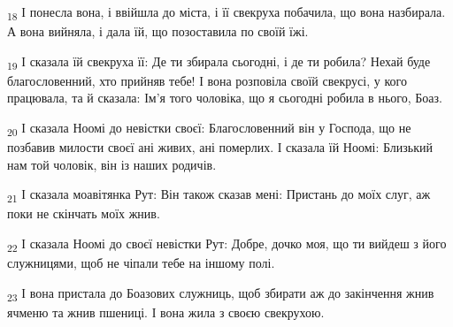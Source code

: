 \begin{tcolorbox}
\textsubscript{18} І понесла вона, і ввійшла до міста, і її свекруха побачила, що вона назбирала. А вона вийняла, і дала їй, що позоставила по своїй їжі.
\end{tcolorbox}
\begin{tcolorbox}
\textsubscript{19} І сказала їй свекруха її: Де ти збирала сьогодні, і де ти робила? Нехай буде благословенний, хто прийняв тебе! І вона розповіла своїй свекрусі, у кого працювала, та й сказала: Ім'я того чоловіка, що я сьогодні робила в нього, Боаз.
\end{tcolorbox}
\begin{tcolorbox}
\textsubscript{20} І сказала Ноомі до невістки своєї: Благословенний він у Господа, що не позбавив милости своєї ані живих, ані померлих. І сказала їй Ноомі: Близький нам той чоловік, він із наших родичів.
\end{tcolorbox}
\begin{tcolorbox}
\textsubscript{21} І сказала моавітянка Рут: Він також сказав мені: Пристань до моїх слуг, аж поки не скінчать моїх жнив.
\end{tcolorbox}
\begin{tcolorbox}
\textsubscript{22} І сказала Ноомі до своєї невістки Рут: Добре, дочко моя, що ти вийдеш з його служницями, щоб не чіпали тебе на іншому полі.
\end{tcolorbox}
\begin{tcolorbox}
\textsubscript{23} І вона пристала до Боазових служниць, щоб збирати аж до закінчення жнив ячменю та жнив пшениці. І вона жила з своєю свекрухою.
\end{tcolorbox}
